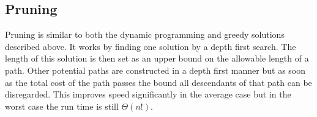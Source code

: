 \documentclass{article}
\begin{document}
\subsection{Pruning}
Pruning is similar to both the dynamic programming and greedy solutions described above. It works by finding one solution by a depth first search. The length of this solution is then set as an upper bound on the allowable length of a path. Other potential paths are constructed in a depth first manner but as soon as the total cost of the path passes the bound all descendants of that path can be disregarded. This improves speed significantly in the average case but in the worst case the run time is still $\Theta(n!)$. 
\end{document}
